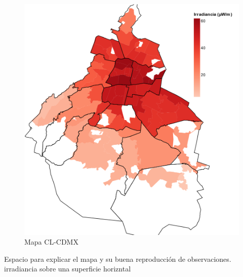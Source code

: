 \begin{figure}[H]
  \centering
    \includegraphics[width=1\textwidth]{MapaCLCDMX}
  \caption{Mapa CL-CDMX} 
  \label{MapaCLDMX}
\end{figure}

\newpage

Espacio para explicar el mapa y su buena reproducción de observaciones. irradiancia sobre una superficie horizntal
